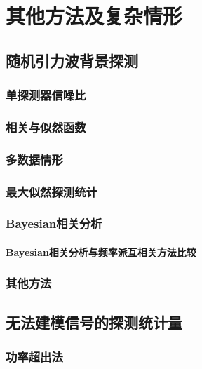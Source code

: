 
\chapter{其他方法及复杂情形}
\label{chap8}

\section{随机引力波背景探测}
\subsection{单探测器信噪比}
\subsection{相关与似然函数}
\subsection{多数据情形}
\subsection{最大似然探测统计}
\subsection{Bayesian相关分析}
\subsubsection{Bayesian相关分析与频率派互相关方法比较}
\subsection{其他方法}

\section{无法建模信号的探测统计量}
\subsection{功率超出法}

